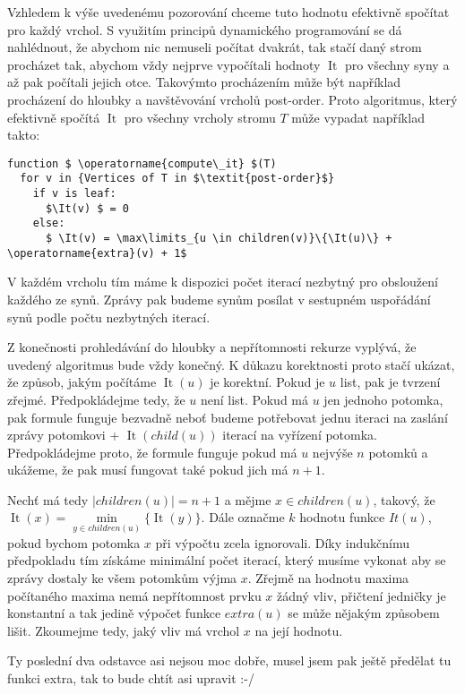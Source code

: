 \documentclass[12pt,a4paper]{article}
\theoremstyle{plain}
\newcommand{\It}{\operatorname{It}}
\begin{document}
Vzhledem k výše uvedenému pozorování chceme tuto hodnotu efektivně spočítat pro každý vrchol. S využitím principů dynamického programování se dá nahlédnout, že abychom nic nemuseli počítat dvakrát, tak stačí daný strom procházet tak, abychom vždy nejprve vypočítali hodnoty $ \It $ pro všechny syny a až pak počítali jejich otce. Takovýmto procházením může být například procházení do hloubky a navštěvování vrcholů post-order. Proto algoritmus, který efektivně spočítá $ \It $ pro všechny vrcholy stromu $ T $  může vypadat například takto:

\begin{lstlisting}[mathescape]
function $ \operatorname{compute\_it} $(T)
  for v in {Vertices of T in $\textit{post-order}$}
    if v is leaf:
      $\It(v) $ = 0
    else:
      $ \It(v) = \max\limits_{u \in children(v)}\{\It(u)\} + \operatorname{extra}(v) + 1$
\end{lstlisting}

V každém vrcholu tím máme k dispozici počet iterací nezbytný pro obsloužení každého ze synů. Zprávy pak budeme synům posílat v sestupném uspořádání synů podle počtu nezbytných iterací.

Z konečnosti prohledávání do hloubky a nepřítomnosti rekurze vyplývá, že uvedený algoritmus bude vždy konečný. K důkazu korektnosti proto stačí ukázat, že způsob, jakým počítáme $ \It(u) $ je korektní. Pokud je $ u $ list, pak je tvrzení zřejmé. Předpokládejme tedy, že $ u $ není list. Pokud má $ u $ jen jednoho potomka, pak formule funguje bezvadně neboť budeme potřebovat jednu iteraci na zaslání zprávy potomkovi + $ \It(child(u)) $ iterací na vyřízení potomka. Předpokládejme proto, že formule funguje pokud má $ u $ nejvýše $ n $ potomků a ukážeme, že pak musí fungovat také pokud jich má $ n + 1 $. 

Nechť má tedy $ |children(u)| = n+1 $ a mějme $ x \in children(u) $, takový, že $ \It(x) = \min\limits_{y \in children(u)}\{\It(y)\} $. Dále označme $ k $ hodnotu funkce $ It(u) $, pokud bychom potomka $ x $ při výpočtu zcela ignorovali. Díky indukčnímu předpokladu tím získáme minimální počet iterací, který musíme vykonat aby se zprávy dostaly ke všem potomkům výjma $ x $. Zřejmě na hodnotu maxima počítaného maxima nemá nepřítomnost prvku $ x $ žádný vliv, přičtení jedničky je konstantní a tak jedině výpočet funkce $ extra(u) $ se může nějakým způsobem lišit. Zkoumejme tedy, jaký vliv má vrchol $ x $ na její hodnotu.  

Ty poslední dva odstavce asi nejsou moc dobře, musel jsem pak ještě předělat tu funkci extra, tak to bude chtít asi upravit :-/
\end{document}
